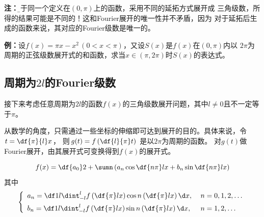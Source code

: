 \begin{center}
	
\end{center}

{\bf 注：}{\b 对于同一个定义在$(0,\pi)$上的函数，采用不同的延拓方式展开成
三角级数，所得的结果可能是不同的！这和Fourier展开的唯一性并不矛盾，因为
对于延拓后生成的函数来说，其对应的Fourier级数是唯一的。}

{\bf 例：}设$f(x)=\pi x-x^2\,(0<x<\pi)$，又设$S(x)$是$f(x)$在$(0,\pi)$内以
$2\pi$为周期的正弦级数展开式的和函数，求当$x\in(\pi,2\pi)$时$S(x)$的表达式。

\subsection{周期为$2l$的Fourier级数}

接下来考虑任意周期为$2l$的函数$f(x)$的三角级数展开问题，其中$l\ne0$且不一定等于$\pi$。

从数学的角度，只需通过一些坐标的伸缩即可达到展开的目的。具体来说，令$t=\df{\pi}{l}x$，
则$g(t)=f\left(\df{l}{\pi}t\right)$ 是以$2\pi$为周期的函数。 
对$g(t)$做Fourier展开，由其展开式可变换得到$f(x)$的展开式。

$$f(x)=\df{a_0}2+\sumn\left(a_n\cos\df{n\pi}lx+b_n\sin\df{n\pi}lx\right)$$
其中
$$\left\{\begin{array}{ll}
a_n=\df1{l}\dint_{-l}^{l}f\left(\df{\pi}lx\right)
\cos n\left(\df{\pi}lx\right)\d x,\;&
n=0,1,2,\ldots\\[5pt] b_n=\df1{l}\dint_{-l}^{l}f\left(\df{\pi}lx\right)
\sin n\left(\df{\pi}lx\right)\d x,\;& n=1,2,\ldots
\end{array}\right.$$

